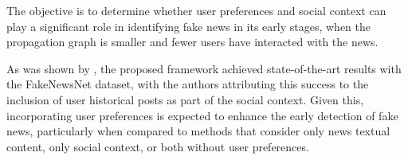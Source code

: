 \documentclass[12pt]{article}
\begin{document}
The objective is to determine whether user preferences and social context can play a 
significant role in identifying fake news in its early stages, 
when the propagation graph is smaller and fewer users have interacted with the news.

As was shown by \cite{dou2021user}, the proposed framework achieved state-of-the-art results
with the FakeNewsNet dataset, with the authors attributing this success to the 
inclusion of user historical posts as part of the social context. 
Given this, incorporating user preferences is expected to enhance the early detection of fake news, 
particularly when compared to methods that consider only news textual content, 
only social context, or both without user preferences.



\end{document}
